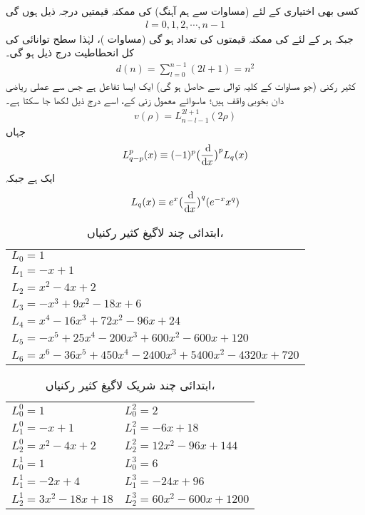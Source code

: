  کسی بھی اختیاری   کے لئے (مساوات  سے ہم آہنگ)  کی ممکنہ قیمتیں درجہ ذیل ہوں گی
\begin{align}
l=0,1,2,\cdots, n-1 
\end{align}
جبکہ ہر   کے لئے    کی ممکنہ قیمتوں کی تعداد    ہو گی (مساوات )،  لہٰذا      سطح توانائی کی کل انحطاطیت درج ذیل ہو گی۔
\begin{align}
d(n)=\sum_{l=0}^{n-1}(2l+1)=n^{2} 
\end{align}
کثیر رکنی  (جو مساوات  کے کلیہ توالی سے حاصل ہو گی) ایک ایسا تفاعل ہے جس سے عملی ریاضی دان بخوبی واقف ہیں؛  ماسوائے معمول زنی کے، اسے درج ذیل لکھا جا سکتا ہے۔
 \begin{align}\label{مساوات_تین_ابعادی_لاگیغ_الف}
v(\rho)=L_{n-l-1}^{2l+1}(2\rho) 
\end{align}
 جہاں
  \begin{align}\label{مساوات_تین_ابعادی_لاگیغ_ب}
L_{q-p}^{p}(x)\equiv(-1)^{p}\big(\frac{\dif}{\dif{x}}\big)^{p}L_{q}(x) 
\end{align} 
 ایک  ہے جبکہ 
\begin{align}\label{مساوات_تین_ابعادی_لاگیغ_پ}
 L_{q}(x)\equiv e^{x}\big(\frac{\dif}{\dif{x}}\big)^{q}(e^{-x}x^{q}) 
\end{align}
\begin{table}
\caption{ابتدائی چند لاگیغ کثیر رکنیاں، }
\label{جدول_ابعاد_لاگیغ_ابتدائی_چند}
\centering
\renewcommand{\arraystretch}{1.25}
\begin{tabular}{l}
\toprule
$L_0=1$\\
$L_1=-x+1$\\
$L_2=x^2-4x+2$\\
$L_3=-x^3+9x^2-18x+6$\\
$L_4=x^4-16x^3+72x^2-96x+24$\\
$L_5=-x^5+25x^4-200x^3+600x^2-600x+120$\\
$L_6=x^6-36x^5+450x^4-2400x^3+5400x^2-4320x+720$\\
\bottomrule
\end{tabular}
\end{table}
\begin{table}
\caption{ابتدائی چند شریک لاگیغ کثیر رکنیاں، }
\label{جدول_ابعادی_شریک_لاگیغ_کثیر_رکنیاں}
\centering
\renewcommand{\arraystretch}{1.25}
\begin{tabular}{ll}
\toprule
$L_0^0=1$  & $L_0^2=2$\\
$L_1^0=-x+1$  &  $L_1^2=-6x+18$\\
$L_2^0=x^2-4x+2$  &  $L_2^2=12x^2-96x+144$\\
$L_0^1=1$  &  $L_0^3=6$\\
$L_1^1=-2x+4$  &  $L_1^3=-24x+96$\\
$L_2^1=3x^2-18x+18$  &  $L_2^3=60x^2-600x+1200$\\
\bottomrule
\end{tabular}
\end{table}
